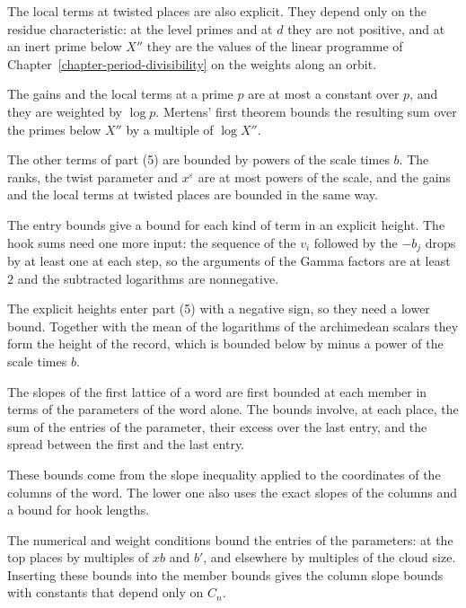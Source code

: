 The local terms at twisted places are also explicit. They depend only on the
residue characteristic: at the level primes and at $d$ they are not positive,
and at an inert prime below $X''$ they are the values of the linear programme
of Chapter~\ref{chapter-period-divisibility} on the weights along an orbit.

The gains and the local terms at a prime $p$ are at most a constant over $p$,
and they are weighted by $\log p$. Mertens' first theorem bounds the resulting
sum over the primes below $X''$ by a multiple of $\log X''$.

The other terms of part (5) are bounded by powers of the scale times $b$. The
ranks, the twist parameter and $x^{\varepsilon}$ are at most powers of the
scale, and the gains and the local terms at twisted places are bounded in the
same way.

The entry bounds give a bound for each kind of term in an explicit height.
The hook sums need one more input: the sequence of the $v_i$ followed by the
$-b_j$ drops by at least one at each step, so the arguments of the Gamma
factors are at least $2$ and the subtracted logarithms are nonnegative.

The explicit heights enter part (5) with a negative sign, so they need a lower
bound. Together with the mean of the logarithms of the archimedean scalars
they form the height of the record, which is bounded below by minus a power of
the scale times $b$.

The slopes of the first lattice of a word are first bounded at each member in
terms of the parameters of the word alone. The bounds involve, at each place,
the sum of the entries of the parameter, their excess over the last entry, and
the spread between the first and the last entry.

These bounds come from the slope inequality applied to the coordinates of the
columns of the word. The lower one also uses the exact slopes of the columns and
a bound for hook lengths.

The numerical and weight conditions bound the entries of the parameters: at the
top places by multiples of $xb$ and $b'$, and elsewhere by multiples of the cloud
size. Inserting these bounds into the member bounds gives the column slope bounds
with constants that depend only on $C_n$.

